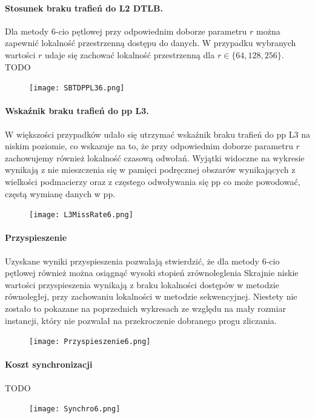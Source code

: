 \documentclass{scrartcl}
\begin{document}
\paragraph{Stosunek braku trafień do L2 DTLB.} Dla metody 6-cio pętlowej przy odpowiednim doborze parametru $r$ można zapewnić lokalność przestrzenną dostępu do danych. W przypadku wybranych wartości $r$ udaje się zachować lokalność przestrzenną dla $r \in \{64, 128, 256\}$. TODO
\begin{figure}[H]
\texttt{[image: SBTDPPL36.png]}\\
\end{figure}

\paragraph{Wskaźnik braku trafień do pp L3.} W większości przypadków udało się utrzymać wskaźnik braku trafień do pp L3 na niskim poziomie, co wskazuje na to, że przy odpowiednim doborze parametru $r$ zachowujemy również lokalność czasową odwołań. Wyjątki widoczne na wykresie wynikają z nie mieszczenia się w pamięci podręcznej obszarów wynikających z wielkości podmacierzy oraz z częstego odwoływania się pp co może powodować, częstą wymianę danych w pp.
\begin{figure}[H]
\texttt{[image: L3MissRate6.png]}
\end{figure}

\paragraph{Przyspieszenie} Uzyskane wyniki przyspieszenia pozwalają stwierdzić, że dla metody 6-cio pętlowej również można osiągnąć wysoki stopień zrównoleglenia Skrajnie niskie wartości przyspieszenia wynikają z braku lokalności dostępów w metodzie równoległej, przy zachowaniu lokalności w metodzie sekwencyjnej. Niestety nie zostało to pokazane na poprzednich wykresach ze względu na mały rozmiar instancji, który nie pozwalał na przekroczenie dobranego progu zliczania.
\begin{figure}[H]
\texttt{[image: Przyspieszenie6.png]}
\end{figure}

\paragraph{Koszt synchronizacji} TODO
\begin{figure}[H]
\texttt{[image: Synchro6.png]}
\end{figure}
\end{document}
